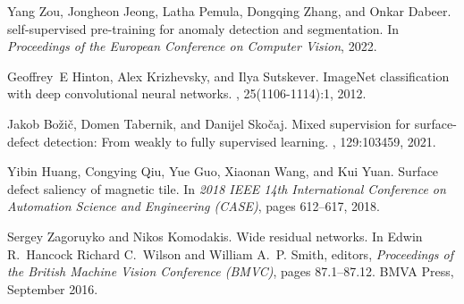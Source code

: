 \documentclass{article}
\begin{document}
{\begin{thebibliography}{10}
Yang Zou, Jongheon Jeong, Latha Pemula, Dongqing Zhang, and Onkar Dabeer.
 self-supervised pre-training for anomaly
  detection and segmentation.
\newblock In {\em Proceedings of the European Conference on Computer Vision},
  2022.

Geoffrey~E Hinton, Alex Krizhevsky, and Ilya Sutskever.
\newblock Image{N}et classification with deep convolutional neural networks.
,
  25(1106-1114):1, 2012.

Jakob Bo{\v{z}}i{\v{c}}, Domen Tabernik, and Danijel Sko{\v{c}}aj.
\newblock Mixed supervision for surface-defect detection: From weakly to fully
  supervised learning.
, 129:103459, 2021.

Yibin Huang, Congying Qiu, Yue Guo, Xiaonan Wang, and Kui Yuan.
\newblock Surface defect saliency of magnetic tile.
\newblock In {\em 2018 IEEE 14th International Conference on Automation Science
  and Engineering (CASE)}, pages 612--617, 2018.

Sergey Zagoruyko and Nikos Komodakis.
\newblock Wide residual networks.
\newblock In Edwin R.~Hancock Richard C.~Wilson and William A.~P. Smith,
  editors, {\em Proceedings of the British Machine Vision Conference (BMVC)},
  pages 87.1--87.12. BMVA Press, September 2016.

\end{thebibliography}
}
\end{document}
